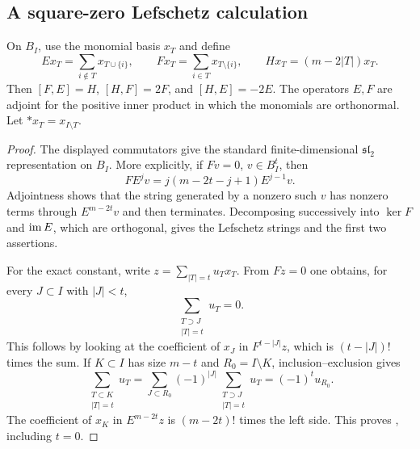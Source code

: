 \subsection{A square-zero Lefschetz calculation}\label{sec:square-zero}

On \(B_I\), use the monomial basis \(x_T\) and define
\[
 E x_T=\sum_{i\notin T}x_{T\cup\{i\}},\qquad
 F x_T=\sum_{i\in T}x_{T\setminus\{i\}},\qquad
 Hx_T=(m-2|T|)x_T.
\]
Then \([F,E]=H\), \([H,F]=2F\), and \([H,E]=-2E\).
The operators \(E,F\) are adjoint for the positive inner product
in which the monomials are orthonormal. Let
\(*x_T=x_{I\setminus T}\).


\begin{proof}
The displayed commutators give the standard finite-dimensional
\(\mathfrak{sl}_2\) representation on \(B_I\). More explicitly,
if \(Fv=0\), \(v\in B_I^t\), then
\[
 FE^jv=j(m-2t-j+1)E^{j-1}v.
\]
Adjointness shows that the string generated by a nonzero such \(v\)
has nonzero terms through \(E^{m-2t}v\) and then terminates.
Decomposing successively into \(\ker F\) and \(\operatorname{im} E\), which
are orthogonal, gives the Lefschetz strings and the first two
assertions.

For the exact constant, write \(z=\sum_{|T|=t}u_Tx_T\).
From \(Fz=0\) one obtains, for every \(J\subset I\) with
\(|J|<t\),
\[
 \sum_{\substack{T\supset J\\|T|=t}}u_T=0.
\]
This follows by looking at the coefficient of \(x_J\) in
\(F^{t-|J|}z\), which is \((t-|J|)!\) times the sum. If
\(K\subset I\) has size \(m-t\) and \(R_0=I\setminus K\),
inclusion--exclusion gives
\[
 \sum_{\substack{T\subset K\\|T|=t}}u_T
 =\sum_{J\subset R_0}(-1)^{|J|}
       \sum_{\substack{T\supset J\\|T|=t}}u_T
 =(-1)^tu_{R_0}.
\]
The coefficient of \(x_K\) in \(E^{m-2t}z\) is
\((m-2t)!\) times the left side. This proves
, including \(t=0\).
\end{proof}

